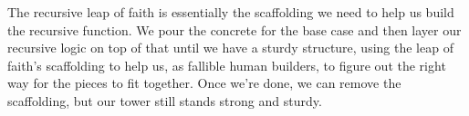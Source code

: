 \begin{meta}
The recursive leap of faith is essentially the scaffolding we need to help us build the recursive function. We pour the concrete for the base case and then layer our recursive logic on top of that until we have a sturdy structure, using the leap of faith's scaffolding to help us, as fallible human builders, to figure out the right way for the pieces to fit together. Once we're done, we can remove the scaffolding, but our tower still stands strong and sturdy. 
\end{meta}
